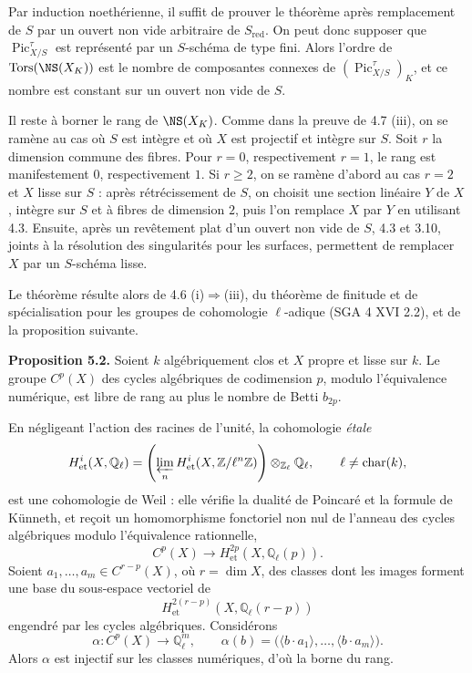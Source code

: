 \documentclass[11pt]{article}
\providecommand{\Pic}{\operatorname{Pic}}
\providecommand{\Z}{\mathbb Z}
\providecommand{\Q}{\mathbb Q}
\begin{document}
Par induction noeth\'erienne, il suffit de prouver le th\'eor\`eme apr\`es remplacement de $S$ par un ouvert non vide arbitraire de $S_{\mathrm{red}}$. On peut donc supposer que $\Pic^\tau_{X/S}$ est repr\'esent\'e par un $S$-sch\'ema de type fini. Alors l'ordre de $\operatorname{Tors}(\NS(X_K))$ est le nombre de composantes connexes de $(\Pic^\tau_{X/S})_K$, et ce nombre est constant sur un ouvert non vide de $S$.

Il reste \`a borner le rang de $\NS(X_K)$. Comme dans la preuve de 4.7 (iii), on se ram\`ene au cas o\`u $S$ est int\`egre et o\`u $X$ est projectif et int\`egre sur $S$. Soit $r$ la dimension commune des fibres. Pour $r=0$, respectivement $r=1$, le rang est manifestement $0$, respectivement $1$. Si $r\ge2$, on se ram\`ene d'abord au cas $r=2$ et $X$ lisse sur $S$ : apr\`es r\'etr\'ecissement de $S$, on choisit une section lin\'eaire $Y$ de $X$, int\`egre sur $S$ et \`a fibres de dimension $2$, puis l'on remplace $X$ par $Y$ en utilisant 4.3. Ensuite, apr\`es un rev\^etement plat d'un ouvert non vide de $S$, 4.3 et 3.10, joints \`a la r\'esolution des singularit\'es pour les surfaces, permettent de remplacer $X$ par un $S$-sch\'ema lisse.

Le th\'eor\`eme r\'esulte alors de 4.6 (i)$\Rightarrow$(iii), du th\'eor\`eme de finitude et de sp\'ecialisation pour les groupes de cohomologie $\ell$-adique (SGA 4 XVI 2.2), et de la proposition suivante.

\textbf{Proposition 5.2.} Soient $k$ alg\'ebriquement clos et $X$ propre et lisse sur $k$. Le groupe $C^p(X)$ des cycles alg\'ebriques de codimension $p$, modulo l'\'equivalence num\'erique, est libre de rang au plus le nombre de Betti $b_{2p}$.

En n\'egligeant l'action des racines de l'unit\'e, la cohomologie \textit{étale}
\[
   H^i_{\mathrm{et}}(X,\Q_\ell)
   =\left(\varprojlim_n H^i_{\mathrm{et}}(X,\Z/\ell^n\Z)\right)\otimes_{\Z_\ell}\Q_\ell,
   \qquad \ell\ne\operatorname{char}(k),
\]
est une cohomologie de Weil : elle v\'erifie la dualit\'e de Poincar\'e et la formule de K\"unneth, et re\c{c}oit un homomorphisme fonctoriel non nul de l'anneau des cycles alg\'ebriques modulo l'\'equivalence rationnelle,
\[
   C^p(X)\longrightarrow H^{2p}_{\mathrm{et}}(X,\Q_\ell(p)).
\]
Soient $a_1,\ldots,a_m\in C^{r-p}(X)$, o\`u $r=\dim X$, des classes dont les images forment une base du sous-espace vectoriel de
\[
   H^{2(r-p)}_{\mathrm{et}}(X,\Q_\ell(r-p))
\]
engendr\'e par les cycles alg\'ebriques. Consid\'erons
\[
   \alpha:C^p(X)\longrightarrow \Q_\ell^m,
   \qquad
   \alpha(b)=\bigl(\langle b\cdot a_1\rangle,\ldots,\langle b\cdot a_m\rangle\bigr).
\]
Alors $\alpha$ est injectif sur les classes num\'eriques, d'o\`u la borne du rang.
\end{document}
